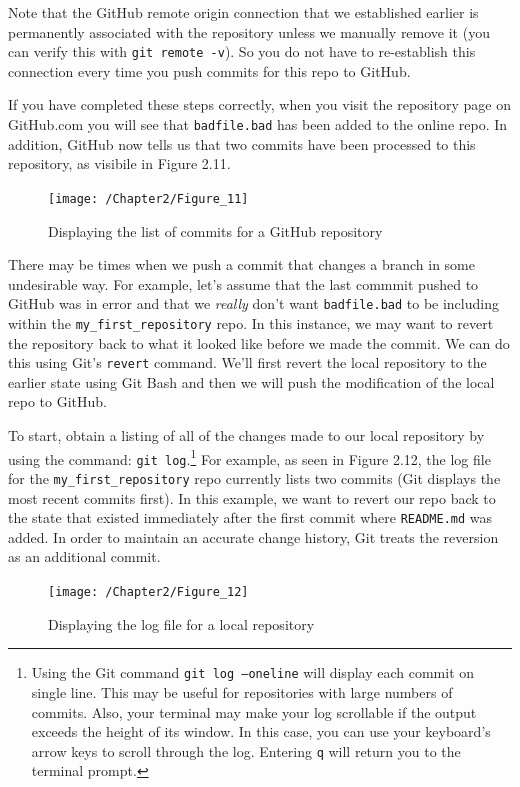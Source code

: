 \documentclass{book}
\begin{document}
Note that the GitHub remote origin connection that we established earlier is permanently associated with the repository unless we manually remove it (you can verify this with \texttt{git remote -v}). So you do not have to re-establish this connection every time you push commits for this repo to GitHub.

If you have completed these steps correctly, when you visit the repository page on GitHub.com you will see that \texttt{badfile.bad} has been added to the online repo. In addition, GitHub now tells us that two commits have been processed to this repository, as visibile in Figure 2.11.

\begin{figure}[h]
	\caption{Displaying the list of commits for a GitHub repository}
	\centering\texttt{[image: /Chapter2/Figure\_11]}
\end{figure}

There may be times when we push a commit that changes a branch in some undesirable way. For example, let's assume that the last commmit pushed to GitHub was in error and that we \textit{really} don't want \texttt{badfile.bad} to be including within the \texttt{my\_first\_repository} repo. In this instance, we may want to revert the repository back to what it looked like before we made the commit. We can do this using Git's \texttt{revert} command. We'll first revert the local repository to the earlier state using Git Bash and then we will push the modification of the local repo to GitHub.

To start, obtain a listing of all of the changes made to our local repository by using the command: \texttt{git log}.\footnote{Using the Git command \texttt{git log --oneline} will display each commit on single line. This may be useful for repositories with large numbers of commits. Also, your terminal may make your log scrollable if the output exceeds the height of its window. In this case, you can use your keyboard's arrow keys to scroll through the log. Entering \texttt{q} will return you to the terminal prompt.} For example, as seen in Figure 2.12, the log file for the  \texttt{my\_first\_repository} repo currently lists two commits (Git displays the most recent commits first). In this example, we want to revert our repo back to the state that existed immediately after the first commit where \texttt{README.md} was added. In order to maintain an accurate change history, Git treats the reversion as an additional commit.

\begin{figure}[h]
	\caption{Displaying the log file for a local repository}
	\centering\texttt{[image: /Chapter2/Figure\_12]}
\end{figure}
 
\end{document}
